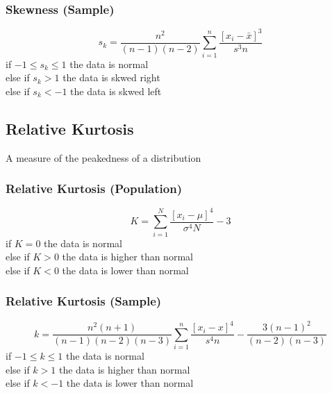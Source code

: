 \documentclass[twocolumn]{article}
\begin{document}
\subsubsection{Skewness (Sample)}
\begin{equation}
    s_{k} = \frac{n^{2}}{(n-1)(n-2)}\sum_{i=1}^{n}\frac{[x_{i} - \bar{x}]^{3}}{s^{3}n}
\end{equation}
if $-1 \leq s_{k} \leq 1$ the data is normal\\
else if $s_{k} > 1$ the data is skwed right\\
else if $s_{k} < -1$ the data is skwed left
\subsection{Relative Kurtosis}
A measure of the peakedness of a distribution
\subsubsection{Relative Kurtosis (Population)}
\begin{equation}
    K = \sum_{i=1}^{N}\frac{[x_{i} - \mu]^{4}}{\sigma^{4}N} - 3
\end{equation}
if $K = 0$ the data is normal\\
else if $K > 0$ the data is higher than normal\\
else if $K < 0$ the data is lower than normal
\subsubsection{Relative Kurtosis (Sample)}
\tiny
\begin{equation}
    k = \frac{n^{2}(n+1)}{(n-1)(n-2)(n-3)} \sum_{i=1}^{n}\frac{[x_{i}-x]^{4}}{s^{4}n}-\frac{3(n-1)^{2}}{(n-2)(n-3)}
\end{equation}
\normalsize
if $-1 \leq k \leq 1$ the data is normal\\
else if $k > 1$ the data is higher than normal\\
else if $k < -1$ the data is lower than normal
\end{document}
